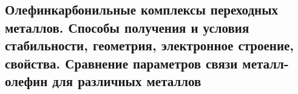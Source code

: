 
\subsection*{Олефинкарбонильные комплексы переходных металлов. Способы получения и условия стабильности, геометрия, электронное строение, свойства. Сравнение параметров связи металл-олефин для различных металлов}